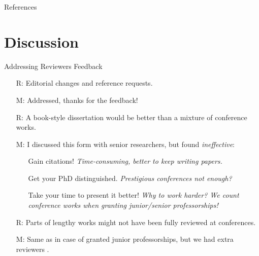 \documentclass[9pt]{beamer}					%
\begin{document}
\begin{frame}[allowframebreaks]{References}
	\tiny
	
\end{frame}

\section{Discussion }

\begin{frame}{Addressing Reviewers Feedback}
\begin{itemize}
    \item[R:] Editorial changes and reference requests.
    \item[M:] Addressed, thanks for the feedback!
    \item[R:] A book-style dissertation would be better than a mixture of conference works.
    \item[M:] I discussed this form with senior researchers, but found \emph{ineffective}:
    \begin{itemize}
        \item[\emoji{carrot}] Gain citations! \emph{Time-consuming, better to keep writing papers.}
        \item[\emoji{carrot}] Get your PhD distinguished. \emph{Prestigious conferences not enough?}
        \item[\emoji{sweat-droplets}] Take your time to present it better! \emph{Why to work harder? We count conference works when granting junior/senior  professorships!} 
    \end{itemize}
    \item[R:] Parts of lengthy works might not have been fully reviewed at conferences.
    \item[M:] Same as in case of granted junior professorships, but we had extra reviewers .
\end{itemize}
\end{frame}
\end{document}

